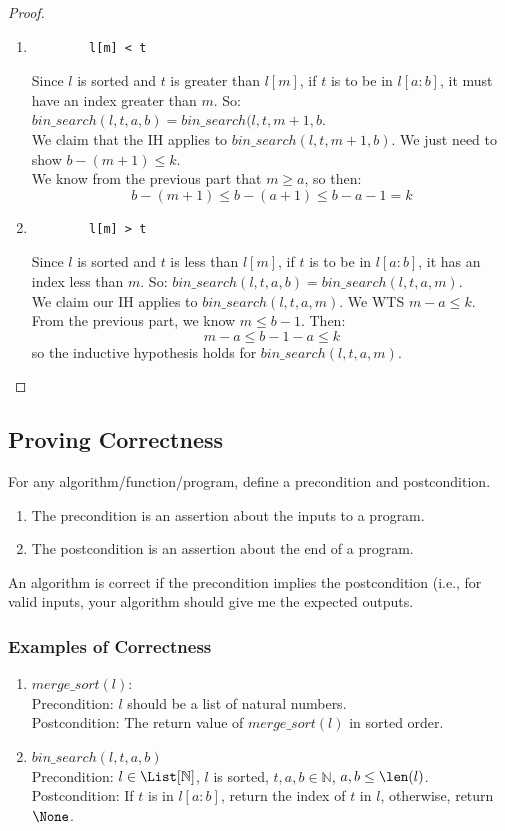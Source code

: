 \documentclass{article}
\begin{document}
\begin{proof}
\begin{enumerate}
    \item \begin{verbatim}
        l[m] < t
    \end{verbatim}
    Since $l$ is sorted and $t$ is greater than $l[m]$, if $t$ is to be in $l[a:b]$, it must have an index greater than $m$. So: $bin\_search(l,t,a,b) = bin\_search(l,t,m+1, b$.\\
    We claim that the IH applies to $bin\_search(l,t,m+1,b)$. We just need to show $b - (m+1) \leq k$.\\
    We know from the previous part that $m \geq a$, so then:
    $$b - (m+1) \leq b - (a+1) \leq b - a - 1 = k$$
    
    \item \begin{verbatim}
        l[m] > t
    \end{verbatim}
    Since $l$ is sorted and $t$ is less than $l[m]$, if $t$ is to be in $l[a:b]$, it has an index less than $m$. So: $bin\_search(l,t,a,b) = bin\_search(l,t,a,m)$.\\
    We claim our IH applies to $bin\_search(l,t,a,m)$. We WTS $m-a \leq k$.\\
    From the previous part, we know $m \leq b - 1$. Then:
    $$m - a \leq b - 1 - a \leq k$$
    so the inductive hypothesis holds for $bin\_search(l,t,a,m)$.
\end{enumerate}
\end{proof}

\subsection{Proving Correctness}
For any algorithm/function/program, define a precondition and postcondition.
\begin{enumerate}
    \item The precondition is an assertion about the inputs to a program.
    \item The postcondition is an assertion about the end of a program.
\end{enumerate}
An algorithm is correct if the precondition implies the postcondition (i.e., for valid inputs, your algorithm should give me the expected outputs.

\subsubsection{Examples of Correctness}
\begin{enumerate}
    \item $merge\_sort(l)$:\\
    Precondition: $l$ should be a list of natural numbers.\\
    Postcondition: The return value of $merge\_sort(l)$ in sorted order.
    
    \item $bin\_search(l,t,a,b)$\\
    Precondition: $l \in \List[\mathbb{N}]$, $l$ is sorted, $t,a,b \in \mathbb{N}$, $a,b \leq \len(l)$.\\
    Postcondition: If $t$ is in $l[a:b]$, return the index of $t$ in $l$, otherwise, return $\None$.
\end{enumerate}
\end{document}
